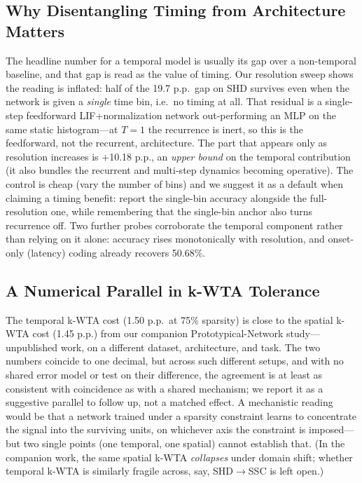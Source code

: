 \documentclass[11pt]{article}
\begin{document}
\subsection{Why Disentangling Timing from Architecture Matters}
The headline number for a temporal model is usually its gap over a non-temporal baseline, and that gap is read as the value of timing. Our resolution sweep shows the reading is inflated: half of the 19.7 p.p.\ gap on SHD survives even when the network is given a \emph{single} time bin, i.e.\ no timing at all. That residual is a single-step feedforward LIF+normalization network out-performing an MLP on the same static histogram---at $T=1$ the recurrence is inert, so this is the feedforward, not the recurrent, architecture. The part that appears only as resolution increases is +10.18 p.p., an \emph{upper bound} on the temporal contribution (it also bundles the recurrent and multi-step dynamics becoming operative). The control is cheap (vary the number of bins) and we suggest it as a default when claiming a timing benefit: report the single-bin accuracy alongside the full-resolution one, while remembering that the single-bin anchor also turns recurrence off. Two further probes corroborate the temporal component rather than relying on it alone: accuracy rises monotonically with resolution, and onset-only (latency) coding already recovers 50.68\%.

\subsection{A Numerical Parallel in k-WTA Tolerance}
The temporal k-WTA cost (1.50 p.p.\ at 75\% sparsity) is close to the spatial k-WTA cost (1.45 p.p.) from our companion Prototypical-Network study---unpublished work, on a different dataset, architecture, and task. The two numbers coincide to one decimal, but across such different setups, and with no shared error model or test on their difference, the agreement is at least as consistent with coincidence as with a shared mechanism; we report it as a suggestive parallel to follow up, not a matched effect. A mechanistic reading would be that a network trained under a sparsity constraint learns to concentrate the signal into the surviving units, on whichever axis the constraint is imposed---but two single points (one temporal, one spatial) cannot establish that. (In the companion work, the same spatial k-WTA \emph{collapses} under domain shift; whether temporal k-WTA is similarly fragile across, say, SHD$\to$SSC is left open.)
\end{document}
